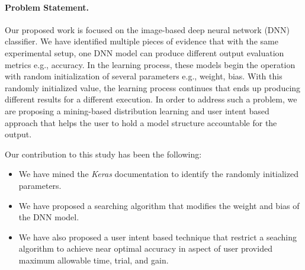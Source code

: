 \paragraph{Problem Statement. }Our proposed work is focused on the image-based deep neural network (DNN) classifier. We have identified multiple pieces of evidence that with the same experimental setup, one DNN model can produce different output evaluation metrics e.g., accuracy. In the learning process, these models begin the operation with random initialization of several parameters e.g., weight, bias. With this randomly initialized value, the learning process continues that ends up producing different results for a different execution. In order to address such a problem, we are proposing a mining-based distribution learning and 
user intent based approach that helps the user to hold a model structure accountable for the output.


Our contribution to this study has been the following:
\begin{itemize}
	\item We have mined the \emph{Keras} documentation to identify the randomly initialized parameters.
	\item We have proposed a searching algorithm that modifies the weight and bias of the DNN model.
	\item We have also proposed a user intent based technique that restrict a seaching algorithm to achieve near optimal accuracy in aspect of user provided maximum allowable time, trial, and gain.
\end{itemize}
